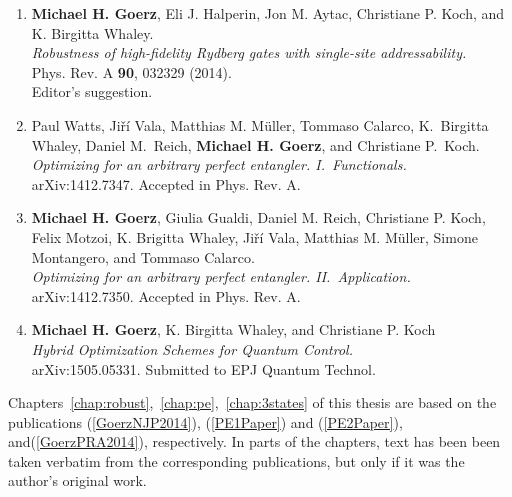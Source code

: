\begin{enumerate}
  \item
  {\bf Michael H. Goerz}, Eli J. Halperin, Jon M. Aytac, Christiane P. Koch, and K.  Birgitta Whaley. \\
  {\it Robustness of high-fidelity Rydberg gates with single-site addressability.} \\
  Phys. Rev. A {\bf 90}, 032329 (2014). \\
  Editor's suggestion.
  \label{GoerzPRA2014}

  \item
  Paul Watts, Ji\v{r}\'i Vala, Matthias M. M\"uller, Tommaso Calarco, K.\ Birgitta Whaley, Daniel M.\ Reich, {\bf Michael H. Goerz}, and Christiane P.\ Koch. \\
  {\it Optimizing for an arbitrary perfect entangler. I.~Functionals.} \\
  arXiv:1412.7347. Accepted in Phys. Rev. A.
  \label{PE1Paper}

  \item
  {\bf Michael H. Goerz}, Giulia Gualdi, Daniel M. Reich, Christiane P. Koch, Felix Motzoi, K. Brigitta Whaley, Ji\v{r}\'i Vala, Matthias M. M\"uller, Simone Montangero, and Tommaso Calarco. \\
  {\it Optimizing for an arbitrary perfect entangler. II.~Application.} \\
  arXiv:1412.7350. Accepted in Phys. Rev. A.
  \label{PE2Paper}

  \item
  {\bf Michael H. Goerz}, K. Birgitta Whaley, and Christiane P. Koch\\
  {\it Hybrid Optimization Schemes for Quantum Control.} \\
  arXiv:1505.05331. Submitted to EPJ Quantum Technol.
  \label{HybridPaper}

\end{enumerate}

\noindent
Chapters~\ref{chap:robust},~\ref{chap:pe},~\ref{chap:3states} of this thesis are
based on the publications (\ref{GoerzNJP2014}), (\ref{PE1Paper}) and
(\ref{PE2Paper}), and(\ref{GoerzPRA2014}), respectively.
In parts of the chapters, text has been been taken verbatim from the
corresponding publications, but only if it was the author's
original work.
